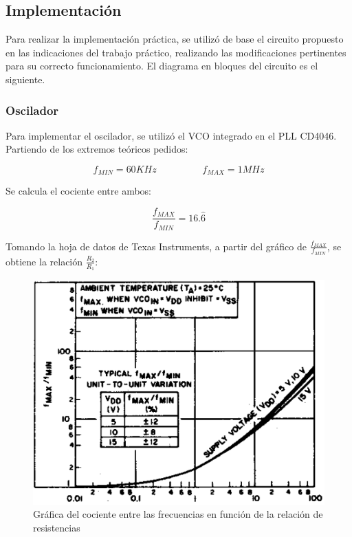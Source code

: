 \documentclass[assd_tp3_main.tex]{subfiles}
\begin{document}
\subsection{Implementación}

Para realizar la implementación práctica, se utilizó de base el circuito propuesto en las indicaciones del trabajo práctico, realizando las modificaciones pertinentes para su correcto funcionamiento. El diagrama en bloques del circuito es el siguiente.


\subsubsection{Oscilador}

Para implementar el oscilador, se utilizó el VCO integrado en el PLL CD4046. Partiendo de los extremos teóricos pedidos:

\[
f_{MIN} = 60KHz \hspace{2cm} f_{MAX} = 1MHz
\]

Se calcula el cociente entre ambos:

\[
\frac{f_{MAX}}{f_{MIN}} = 16.\hat{6}
\] 

Tomando la hoja de datos de Texas Instruments, a partir del gráfico de $\frac{f_{MAX}}{f_{MIN}}$, se obtiene la relación $\frac{R_2}{R_1}$:

\begin{figure}[!ht]
\begin{centering}
\includegraphics[scale=0.4]{images/ej5/f2f1.png}
\par\end{centering}
\caption{Gráfica del cociente entre las frecuencias en función de la relación de resistencias}
\end{figure}
\end{document}
